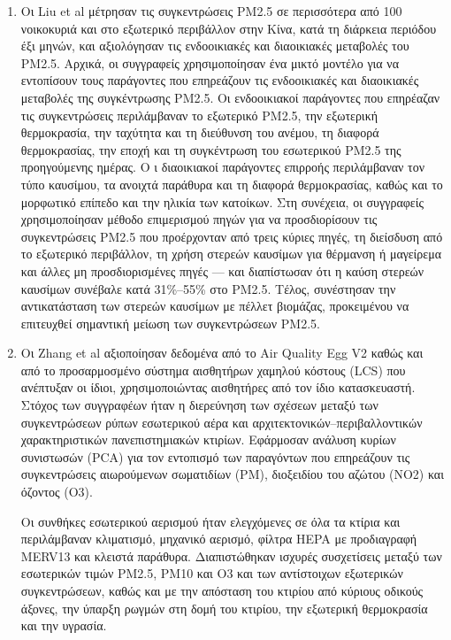 \begin{enumerate}
    \item Οι Liu et al \cite{Liu2023} μέτρησαν τις συγκεντρώσεις PM2.5 σε περισσότερα από 100 νοικοκυριά και στο εξωτερικό περιβάλλον στην Κίνα, κατά τη διάρκεια περιόδου έξι μηνών, και αξιολόγησαν τις ενδοοικιακές και διαοικιακές μεταβολές του PM2.5. 
    Αρχικά, οι συγγραφείς χρησιμοποίησαν ένα μικτό μοντέλο για να εντοπίσουν τους παράγοντες που επηρεάζουν τις ενδοοικιακές και διαοικιακές μεταβολές της συγκέντρωσης PM2.5. 
    Οι ενδοοικιακοί παράγοντες που επηρέαζαν τις συγκεντρώσεις περιλάμβαναν το εξωτερικό PM2.5, την εξωτερική θερμοκρασία, την ταχύτητα και τη διεύθυνση του ανέμου, τη διαφορά θερμοκρασίας, την εποχή και τη συγκέντρωση του εσωτερικού PM2.5 της προηγούμενης ημέρας.
     Ο
     ι διαοικιακοί παράγοντες επιρροής περιλάμβαναν τον τύπο καυσίμου, τα ανοιχτά παράθυρα και τη διαφορά θερμοκρασίας, καθώς και το μορφωτικό επίπεδο και την ηλικία των κατοίκων. 
     Στη συνέχεια, οι συγγραφείς χρησιμοποίησαν μέθοδο επιμερισμού πηγών για να προσδιορίσουν τις συγκεντρώσεις PM2.5 που προέρχονταν από τρεις κύριες πηγές, τη διείσδυση από το εξωτερικό περιβάλλον, τη χρήση στερεών καυσίμων για θέρμανση ή μαγείρεμα 
     και άλλες μη προσδιορισμένες πηγές — και διαπίστωσαν ότι η καύση στερεών καυσίμων συνέβαλε κατά 31\%–55\% στο PM2.5. Τέλος, συνέστησαν την αντικατάσταση των στερεών καυσίμων με πέλλετ βιομάζας, προκειμένου να επιτευχθεί σημαντική μείωση των συγκεντρώσεων PM2.5.
    
    \item Οι Zhang et al \cite{ZHANG2022109643} αξιοποίησαν δεδομένα από το Air Quality Egg V2 καθώς και από το προσαρμοσμένο σύστημα αισθητήρων χαμηλού κόστους (LCS) που ανέπτυξαν οι ίδιοι, χρησιμοποιώντας αισθητήρες από τον ίδιο κατασκευαστή.
     Στόχος των συγγραφέων ήταν η διερεύνηση των σχέσεων μεταξύ των συγκεντρώσεων ρύπων εσωτερικού αέρα και αρχιτεκτονικών–περιβαλλοντικών χαρακτηριστικών πανεπιστημιακών κτιρίων. 
     Εφάρμοσαν ανάλυση κυρίων συνιστωσών (PCA) για τον εντοπισμό των παραγόντων που επηρεάζουν τις συγκεντρώσεις αιωρούμενων σωματιδίων (PM), διοξειδίου του αζώτου (NO2) και όζοντος (O3).

    Οι συνθήκες εσωτερικού αερισμού ήταν ελεγχόμενες σε όλα τα κτίρια και περιλάμβαναν κλιματισμό, μηχανικό αερισμό, φίλτρα HEPA με προδιαγραφή MERV13 και κλειστά παράθυρα. 
    Διαπιστώθηκαν ισχυρές συσχετίσεις μεταξύ των εσωτερικών τιμών PM2.5, PM10 και O3 και των αντίστοιχων εξωτερικών συγκεντρώσεων, καθώς και με την απόσταση του κτιρίου από κύριους οδικούς άξονες, την ύπαρξη ρωγμών στη δομή του κτιρίου, 
    την εξωτερική θερμοκρασία και την υγρασία. 
    

\end{enumerate}

